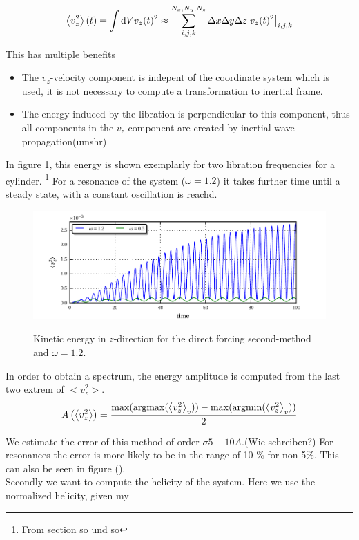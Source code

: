 \begin{align}
    \left<v_z^2 \right>(t) =  \int \mathop{}\!\mathrm{d} V v_z(t)^2 \approx \sum_{i, j, k}^{N_x,N_y,N_z} \Delta x \Delta y \Delta z \left.v_z(t)^2 \right|_{i,j,k}
\end{align}

This has multiple benefits

\begin{itemize}
    \item The $v_z$-velocity component is indepent of the coordinate system which is used, it is not necessary
                to compute a transformation to inertial frame.
    \item The energy induced by the libration is perpendicular to this component, thus all components
            in the $v_z$-component are created by inertial  wave propagation(umshr)
\end{itemize}

In figure \ref{fig:cone:cyl_vzmode}, this energy is shown exemplarly for two libration frequencies for a cylinder.
\footnote{From section so und so}
For a resonance of the system ($\omega=1.2$) it takes further time until a steady state, with a constant oscillation is reachd.

\begin{figure}[!pb]
  \includegraphics{gfx/cone/cylinder/cyl_vz.pdf}\label{fig:cone:cyl_vzmode}
  \caption{Kinetic energy in $z$-direction for the direct forcing second-method and $\omega=1.2$.}
\end{figure}
\clearpage

In order to obtain a spectrum, the energy amplitude is computed from the last two extrem of $<v_z^2>$.
\begin{align}
    A\left(\left<v_z^2\right>\right) = \frac{\max(\operatorname*{argmax}(\left<v_z^2\right>_{v})) - \max(\operatorname*{argmin}(\left<v_z^2\right>_{v}))}{2}
\end{align}

We estimate the error of this method of order $\sigma 5-10A$.(Wie schreiben?)
For resonances the error is more likely to be in the range of 10 \% for non 5\%.
This can also be seen in figure ().\\
Secondly we want to compute the helicity of the system.
Here we use the normalized helicity, given my  \citep{XXX}

